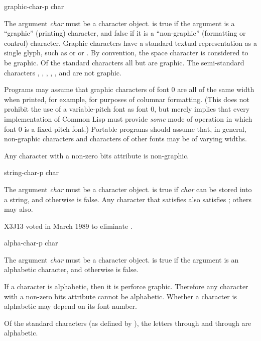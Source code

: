 \begin{defun}[Function]
graphic-char-p char

The argument {\it char} must be a character object.
 is true if the argument is a ``graphic'' (printing)
character, and false if it is a ``non-graphic'' (formatting or control)
character.  Graphic characters have a standard textual representation
as a single glyph, such as  or \cd{*} or \cd{=}.
By convention, the space character is considered to be graphic.
Of the standard characters
all but  are graphic.
The semi-standard characters
, , , , ,
and  are not graphic.

Programs may assume that
graphic characters of font 0 are all of the same width
when printed, for example, for purposes of columnar
formatting.  (This does not prohibit the use of a variable-pitch font
as font 0, but merely implies that every implementation of Common Lisp
must provide {\it some} mode of operation in which font 0 is
a fixed-pitch font.)
Portable programs should assume that, in general,
non-graphic characters and characters of
other fonts may be of varying widths.

Any character with a non-zero bits attribute is non-graphic.
\end{defun}

\begin{obsolete}
\begin{defun}[Function]
string-char-p char

The argument {\it char} must be a character object.
 is true if {\it char} can be stored into
a string, and otherwise is false.
Any character that satisfies 
also satisfies ; others may also.
\end{defun}
\end{obsolete}

\begin{newer}
X3J13 voted in March 1989 
to eliminate .
\end{newer}

\begin{defun}[Function]
alpha-char-p char

The argument {\it char} must be a character object.
 is true if the argument is an alphabetic
character, and otherwise is false.

If a character is alphabetic, then it is perforce graphic.
Therefore any character with a non-zero bits attribute cannot be alphabetic.
Whether a character is alphabetic may depend on its font number.

Of the standard characters (as defined by ),
the letters  through  and  through  are alphabetic.
\end{defun}

